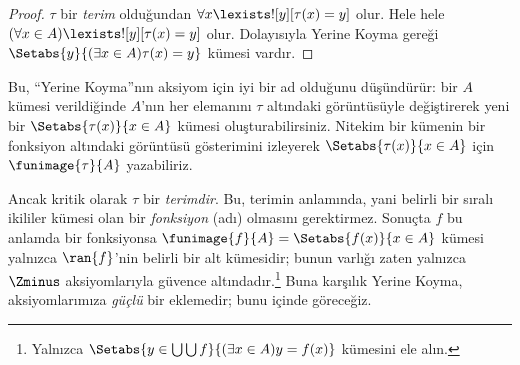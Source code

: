 \documentclass[../../../include/open-logic-section]{subfiles}
\begin{document}
\begin{proof}
$\tau$ bir \emph{terim} olduğundan
$\forall x\lexists![y][\tau(x)=y]$ olur. Hele hele
$(\forall x\in A)\lexists![y][\tau(x)=y]$ olur. Dolayısıyla Yerine Koyma
gereği $\Setabs{y}{(\exists x\in A)\tau(x)=y}$ kümesi vardır.
\end{proof}
\noindent
Bu, ``Yerine Koyma''nın aksiyom için iyi bir ad olduğunu düşündürür: bir
$A$ kümesi verildiğinde $A$'nın her elemanını $\tau$ altındaki görüntüsüyle
değiştirerek yeni bir $\Setabs{\tau(x)}{x\in A}$ kümesi oluşturabilirsiniz.
Nitekim bir kümenin bir fonksiyon altındaki görüntüsü gösterimini izleyerek
$\Setabs{\tau(x)}{x\in A}$ için $\funimage{\tau}{A}$ yazabiliriz.

Ancak kritik olarak $\tau$ bir \emph{terimdir}. Bu, terimin
 anlamında, yani belirli bir sıralı ikililer
kümesi olan bir \emph{fonksiyon} (adı) olmasını gerektirmez. Sonuçta $f$ bu
anlamda bir fonksiyonsa
$\funimage{f}{A}=\Setabs{f(x)}{x\in A}$ kümesi yalnızca $\ran{f}$'nin
belirli bir alt kümesidir; bunun varlığı zaten yalnızca $\Zminus$
aksiyomlarıyla güvence altındadır.\footnote{Yalnızca
$\Setabs{y \in \bigcup \bigcup f}{(\exists x \in A)y = f(x)}$ kümesini
ele alın.} Buna karşılık Yerine Koyma, aksiyomlarımıza \emph{güçlü} bir
eklemedir; bunu  içinde göreceğiz.
\end{document}
